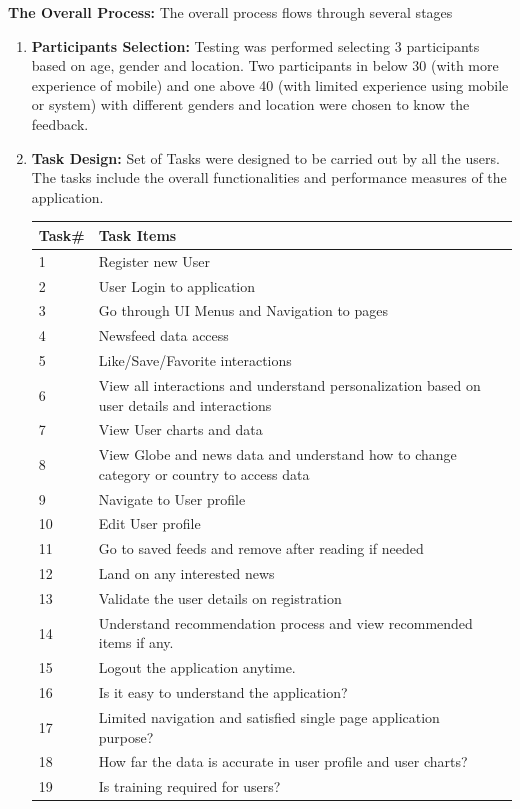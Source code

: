 \textbf{The Overall Process:}
 The overall process flows through several stages \cite{Calvin_Da_2012}
 \begin{enumerate}
 
 \item\textbf{ Participants Selection: }
 Testing was performed selecting 3 participants based on age, gender and location.
 Two participants in below 30 (with more experience of mobile) and one above 40 (with limited experience using mobile or system) with different genders and location were chosen to know the feedback.
  \item \textbf{Task Design: }
 Set of Tasks were designed to be carried out by all the users.
 The tasks include the overall functionalities and performance measures of the application.
 
 \begin{tabular}{ |p{2cm}|p{10cm}|p{10cm}|  }
\hline

\hline
Task\# &  Task Items \\
\hline

1 & Register new User \\
2 & User Login to application \\
3 & Go through UI Menus and Navigation to pages \\
4 & Newsfeed data access \\
5 & Like/Save/Favorite interactions \\
6 & View all interactions and understand personalization based on user details and interactions\\
7 & View User charts and data \\
8 & View Globe and news data and understand how to change category or country to access data\\
9 & Navigate to User profile \\
10 & Edit User profile \\
11 & Go to saved feeds and remove after reading if needed \\
12 & Land on any interested news  \\
13 & Validate the user details on registration  \\
14 & Understand recommendation process and view recommended items if any.\\
15 & Logout the application anytime.\\
16 & Is it easy to understand the application?\\
17 & Limited navigation and satisfied single page application purpose?\\
18 & How far the data is accurate in user profile and user charts?\\
19 & Is training required for users?\\
\hline
\end{tabular}


\end{enumerate}
